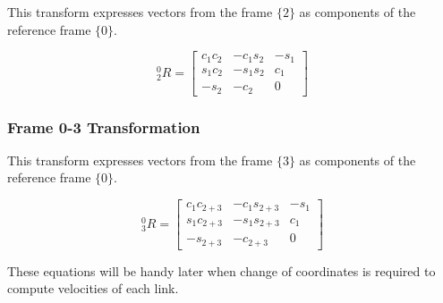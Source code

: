 This transform expresses vectors from the frame $\{ 2 \}$ as components of the reference frame $\{ 0 \}$.

$$
{ }_{2}^{0} R=\left[\begin{array}{ccc}
c_{1} c_{2} & -c_{1} s_{2} & -s_{1} \\
s_{1} c_{2} & -s_{1} s_{2} & c_{1} \\
-s_{2} & -c_{2} & 0
\end{array}\right]
$$


\subsubsection*{Frame 0-3 Transformation}

This transform expresses vectors from the frame $\{ 3 \}$ as components of the reference frame $\{ 0 \}$.

$$
{ }_{3}^{0} R=\left[\begin{array}{ccc}
c_{1} c_{2+3} & -c_{1} s_{2+3} & -s_{1} \\
s_{1} c_{2+3} & -s_{1} s_{2+3} & c_{1} \\
-s_{2+3} & -c_{2+3} & 0
\end{array}\right]
$$


\noindent These equations will be handy later when change of coordinates is required to compute velocities of each link.
